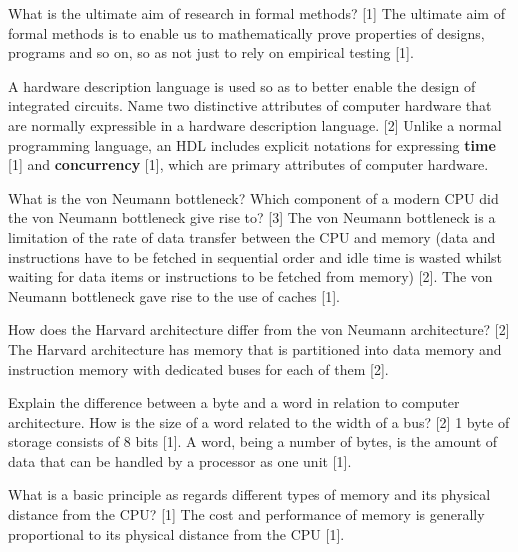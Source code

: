 \documentclass[grid,avery5371]{flashcards}
\begin{document}
\begin{flashcard}[]{What is the ultimate aim of research in formal methods? [1]}
The ultimate aim of formal methods is to enable us to mathematically
prove properties of designs, programs and so on, so as not just to rely
on empirical testing [1].
\end{flashcard}

\begin{flashcard}[]{A hardware description language is used so as to better enable the
design of integrated circuits. Name two distinctive attributes of computer
hardware that are normally expressible in a hardware description
language. [2]}
Unlike a normal programming language, an HDL includes explicit notations
for expressing \textbf{time} [1] and \textbf{concurrency} [1], which are primary
attributes of computer hardware.
\end{flashcard}

\begin{flashcard}[]{What is the von Neumann bottleneck? Which component of a modern
CPU did the von Neumann bottleneck give rise to? [3]}
The von Neumann bottleneck is a limitation of the rate of data transfer
between the CPU and memory (data and instructions have to be
fetched in sequential order and idle time is wasted whilst waiting for
data items or instructions to be fetched from memory) [2]. The von
Neumann bottleneck gave rise to the use of caches [1].

\end{flashcard}

\begin{flashcard}[]{How does the Harvard architecture differ from the von Neumann architecture?
[2]}
The Harvard architecture has memory that is partitioned into data
memory and instruction memory with dedicated buses for each of them
[2].
\end{flashcard}

\begin{flashcard}[]{ Explain the difference between a byte and a word in relation to computer architecture. How is the size of a word related to the width of a
bus? [2]}
1 byte of storage consists of 8 bits [1]. A word, being a number of bytes,
is the amount of data that can be handled by a processor as one unit
[1].
\end{flashcard}

\begin{flashcard}[]{What is a basic principle as regards different types of memory and its physical distance from the CPU? [1]}
The cost and performance of memory is generally proportional to its
physical distance from the CPU [1].
\end{flashcard}
\end{document}
